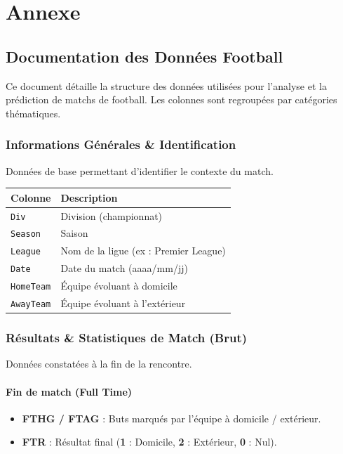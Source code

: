 \newpage
\chapter*{Annexe}

\section{Documentation des Données Football}

Ce document détaille la structure des données utilisées pour l'analyse et la 
prédiction de matchs de football. Les colonnes sont regroupées par catégories 
thématiques.

\subsection{Informations Générales \& Identification}

Données de base permettant d'identifier le contexte du match.

\begin{table}[h]
\centering
\begin{tabular}{|l|l|}
\hline
\textbf{Colonne} & \textbf{Description} \\ \hline
\texttt{Div} & Division (championnat) \\ \hline
\texttt{Season} & Saison \\ \hline
\texttt{League} & Nom de la ligue (ex : Premier League) \\ \hline
\texttt{Date} & Date du match (aaaa/mm/jj) \\ \hline
\texttt{HomeTeam} & Équipe évoluant à domicile \\ \hline
\texttt{AwayTeam} & Équipe évoluant à l'extérieur \\ \hline
\end{tabular}
\end{table}

\subsection{Résultats \& Statistiques de Match (Brut)}

Données constatées à la fin de la rencontre.

\subsubsection{Fin de match (Full Time)}
\begin{itemize}
    \item \textbf{FTHG / FTAG} : Buts marqués par l'équipe à domicile / extérieur.
    \item \textbf{FTR} : Résultat final (\textbf{1} : Domicile, \textbf{2} : 
    Extérieur, \textbf{0} : Nul).
\end{itemize}

